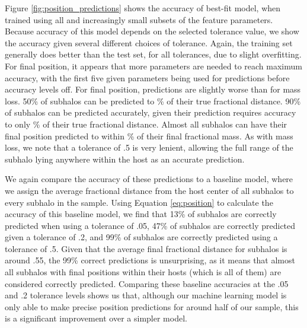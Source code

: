 \documentclass[fleqn,usenatbib]{mnras}
\begin{document}
Figure \ref{fig:position_predictions} shows the accuracy of best-fit model, when trained using all and increasingly small subsets of the feature parameters. Because accuracy of this model depends on the selected tolerance value, we show the accuracy given several different choices of tolerance. Again, the training set generally does better than the test set, for all tolerances, due to slight  overfitting. For final position, it appears that more parameters are needed to reach maximum accuracy, with the first five given parameters being used for predictions before accuracy levels off. For final position, predictions are slightly worse than for mass loss. 50\% of subhalos can be predicted to \% of their true fractional distance. 90\% of subhalos can be predicted accurately, given their prediction requires accuracy to only \% of their true fractional distance. Almost all subhalos can have their final position predicted to within \% of their final fractional mass. As with mass loss, we note that a tolerance of .5 is very lenient, allowing the full range of the subhalo lying anywhere within the host as an accurate prediction.

We again compare the accuracy of these predictions to a baseline model, where we assign the average fractional distance from the host center of all subhalos to every subhalo in the sample. Using Equation \ref{eq:position} to calculate the accuracy of this baseline model, we find that 13\% of subhalos are correctly predicted when using a tolerance of .05, 47\% of subhalos are correctly predicted given a tolerance of .2, and 99\% of subhalos are correctly predicted using a tolerance of .5. Given that the average final fractional distance for subhalos is around .55, the 99\% correct predictions is unsurprising, as it means that  almost all subhalos with final positions within their hosts (which is all of them) are considered correctly predicted. Comparing these baseline accuracies at the .05 and .2 tolerance levels shows us that, although our machine learning model is only able to make precise position predictions for around half of our sample, this is a significant improvement over a simpler model.
\end{document}
